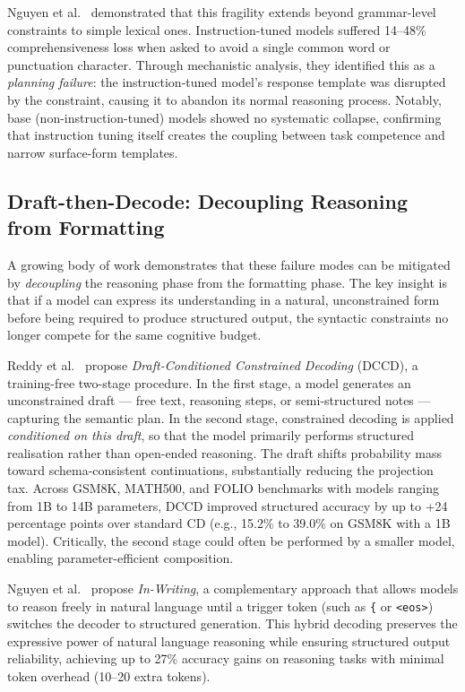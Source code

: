 \documentclass{ceurart}
\begin{document}
Nguyen et al.~\cite{Nguyen2026} demonstrated that this fragility extends beyond
grammar-level constraints to simple lexical ones.
Instruction-tuned models suffered 14--48\% comprehensiveness loss when asked to avoid
a single common word or punctuation character.
Through mechanistic analysis, they identified this as a \emph{planning failure}: the
instruction-tuned model's response template was disrupted by the constraint, causing
it to abandon its normal reasoning process.
Notably, base (non-instruction-tuned) models showed no systematic collapse,
confirming that instruction tuning itself creates the coupling between task competence
and narrow surface-form templates.

\subsection{Draft-then-Decode: Decoupling Reasoning from Formatting}

A growing body of work demonstrates that these failure modes can be mitigated by
\emph{decoupling} the reasoning phase from the formatting phase.
The key insight is that if a model can express its understanding in a natural,
unconstrained form before being required to produce structured output, the syntactic
constraints no longer compete for the same cognitive budget.

Reddy et al.~\cite{Reddy2026} propose \emph{Draft-Conditioned Constrained Decoding}
(DCCD), a training-free two-stage procedure.
In the first stage, a model generates an unconstrained draft --- free text, reasoning
steps, or semi-structured notes --- capturing the semantic plan.
In the second stage, constrained decoding is applied \emph{conditioned on this draft},
so that the model primarily performs structured realisation rather than open-ended
reasoning.
The draft shifts probability mass toward schema-consistent continuations,
substantially reducing the projection tax.
Across GSM8K, MATH500, and FOLIO benchmarks with models ranging from 1B to 14B
parameters, DCCD improved structured accuracy by up to +24 percentage points over
standard CD (e.g., 15.2\% to 39.0\% on GSM8K with a 1B model).
Critically, the second stage could often be performed by a smaller model, enabling
parameter-efficient composition.

Nguyen et al.~\cite{Nguyen2026} propose \emph{In-Writing}, a complementary approach
that allows models to reason freely in natural language until a trigger token (such as
\texttt{\{} or \texttt{<eos>}) switches the decoder to structured generation.
This hybrid decoding preserves the expressive power of natural language reasoning while
ensuring structured output reliability, achieving up to 27\% accuracy gains on
reasoning tasks with minimal token overhead (10--20 extra tokens).
\end{document}
